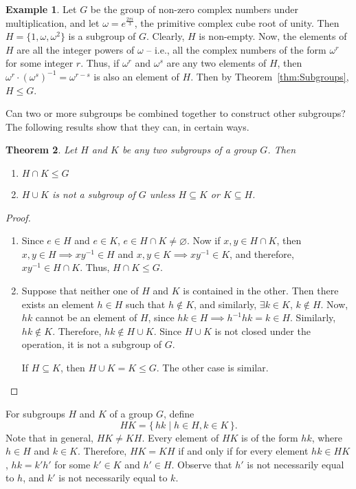 \documentclass[svgnames]{article}
\newtheorem{Theorem}{Theorem}[section]
\theoremstyle{definition}
\newtheorem{Example}[Theorem]{Example}
\theoremstyle{remark}
\begin{document}
\begin{Example}
Let $G$ be the group of non-zero complex numbers under multiplication, and let $\omega = e^{\frac{2\pi i}{3}}$, the primitive complex cube root of unity. Then $H = \{1, \omega, \omega^2\}$ is a subgroup of $G$. Clearly, $H$ is non-empty. Now, the elements of $H$ are all the integer powers of $\omega$ -- i.e., all the complex numbers of the form $\omega^r$ for some integer $r$. Thus, if $\omega^r$ and $\omega^s$ are any two elements of $H$, then $\omega^r \cdot (\omega^s)^{-1}  = \omega^{r - s}$ is also an element of $H$. Then by Theorem~\ref{thm:Subgroups}, $H \le G$.
\end{Example}

Can two or more subgroups be combined together to construct other subgroups? The following results show that they can, in certain ways.
\begin{Theorem}\label{thm:SubgroupsIntUni}
Let $H$ and $K$ be any two subgroups of a group $G$. Then
\begin{enumerate}
\item $H \cap K \le G$
\item $H \cup K$ is not a subgroup of $G$ unless $H \subseteq K$ or $K \subseteq H$.
\end{enumerate}
\end{Theorem}
\begin{proof}
\begin{enumerate}
\item Since $e \in H$ and $e \in K$, $e \in H \cap K \ne \varnothing$. Now if $x, y \in H \cap K$, then $x, y \in H \implies xy^{-1} \in H$ and $x, y \in K \implies xy^{-1} \in K$, and therefore, $xy^{-1} \in H \cap K$. Thus, $H \cap K \le G$.
\item Suppose that neither one of $H$ and $K$ is contained in the other. Then there exists an element $h \in H$ such that $h \notin K$, and similarly, $\exists k \in K$, $k \notin H$. Now, $hk$ cannot be an element of $H$, since $hk \in H \implies h^{-1}hk = k \in H$. Similarly, $hk \notin K$. Therefore, $hk \notin H \cup K$. Since $H \cup K$ is not closed under the operation, it is not a subgroup of $G$.

If $H \subseteq K$, then $H \cup K = K \le G$. The other case is similar.
\end{enumerate}
\end{proof}

\label{def:HK} For subgroups $H$ and $K$ of a group $G$, define
\begin{equation*}
HK = \{\, hk \mid h \in H, k \in K \,\}.
\end{equation*}
Note that in general, $HK \ne KH$. Every element of $HK$ is of the form $hk$, where $h \in H$ and $k \in K$. Therefore, $HK = KH$ if and only if for every element $hk \in HK$, $hk = k'h'$ for some $k' \in K$ and $h' \in H$. Observe that $h'$ is not necessarily equal to $h$, and $k'$ is not necessarily equal to $k$.
\end{document}
